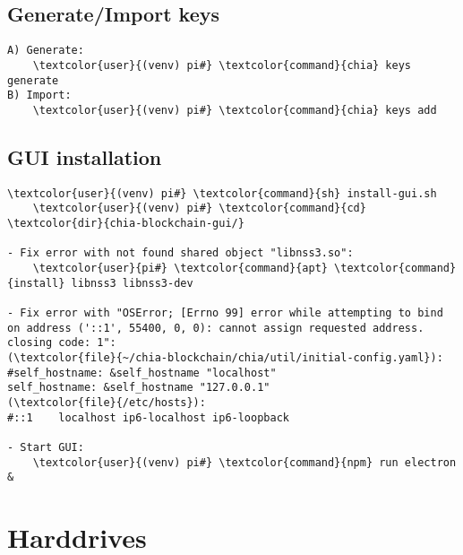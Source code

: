 \documentclass[10pt, a4paper, onecolumn, openany]{book} %
\begin{document}
\subsection{Generate/Import keys}
\begin{Verbatim}[commandchars=\\\{\}]
A) Generate:
    \textcolor{user}{(venv) pi#} \textcolor{command}{chia} keys generate
B) Import:
    \textcolor{user}{(venv) pi#} \textcolor{command}{chia} keys add
\end{Verbatim}
\subsection{GUI installation}
\begin{Verbatim}[commandchars=\\\{\}]
    \textcolor{user}{(venv) pi#} \textcolor{command}{sh} install-gui.sh
    \textcolor{user}{(venv) pi#} \textcolor{command}{cd} \textcolor{dir}{chia-blockchain-gui/}
    
- Fix error with not found shared object "libnss3.so":
    \textcolor{user}{pi#} \textcolor{command}{apt} \textcolor{command}{install} libnss3 libnss3-dev
    
- Fix error with "OSError; [Errno 99] error while attempting to bind 
on address ('::1', 55400, 0, 0): cannot assign requested address. 
closing code: 1":
(\textcolor{file}{~/chia-blockchain/chia/util/initial-config.yaml}):
#self_hostname: &self_hostname "localhost"
self_hostname: &self_hostname "127.0.0.1"
(\textcolor{file}{/etc/hosts}):
#::1    localhost ip6-localhost ip6-loopback

- Start GUI:    
    \textcolor{user}{(venv) pi#} \textcolor{command}{npm} run electron &
\end{Verbatim}

\section{Harddrives}
\end{document}
